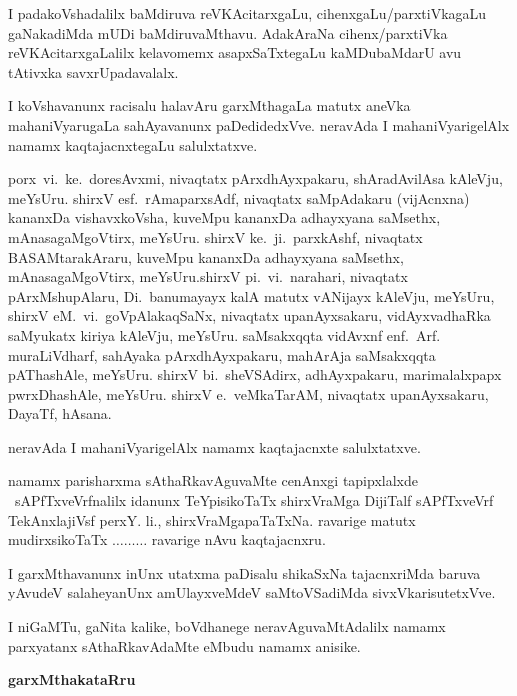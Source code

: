I padakoVshadalilx baMdiruva reVKAcitarxgaLu, cihenxgaLu/parxtiVkagaLu gaNakadiMda mUDi baMdiruvaMthavu. AdakAraNa cihenx/parxtiVka reVKAcitarxgaLalilx kelavomemx asapxSaTxtegaLu kaMDubaMdarU avu tAtivxka savxrUpadavalalx.

I koVshavanunx racisalu halavAru garxMthagaLa matutx aneVka mahaniVyarugaLa sahAyavanunx paDedidedxVve. neravAda I mahaniVyarigelAlx namamx kaqtajacnxtegaLu salulxtatxve.

porx\ vi.~ke.\ doresAvxmi, nivaqtatx pArxdhAyxpakaru, shAradAvilAsa kAleVju, meYsUru. shirxV esf.\ rAmaparxsAdf, nivaqtatx saMpAdakaru (vijAcnxna) kananxDa vishavxkoVsha, kuveMpu kananxDa adhayxyana saMsethx, mAnasagaMgoVtirx, meYsUru. shirxV ke.~ji.\ parxkAshf, nivaqtatx BASAMtarakAraru, kuveMpu kananxDa adhayxyana saMsethx, mAnasagaMgoVtirx, meYsUru.\break shirxV pi.~vi.\ narahari, nivaqtatx pArxMshupAlaru, Di.~banumayayx kalA matutx vANijayx kAleVju, meYsUru, shirxV eM.~vi.\ goVpAlakaqSaNx, nivaqtatx upanAyxsakaru, vidAyxvadhaRka saMyukatx kiriya kAleVju, meYsUru. saMsakxqqta vidAvxnf enf.~Arf. muraLiVdharf, sahAyaka pArxdhAyxpakaru, mahArAja saMsakxqqta pAThashAle, meYsUru. shirxV bi.\ sheVSAdirx, adhAyxpakaru, marimalalxpapx pwrxDhashAle, meYsUru. shirxV e.\ veMkaTarAM, nivaqtatx upanAyxsakaru, DayaTf, hAsana.

neravAda I mahaniVyarigelAlx namamx kaqtajacnxte salulxtatxve.

namamx parisharxma sAthaRkavAguvaMte cenAnxgi tapipxlalxde \eng{\LaTeX}\ sAPfTxveVrfnalilx idanunx TeYpisikoTaTx    
 shirxVraMga DijiTalf sAPfTxveVrf TekAnxlajiVsf perxY. li., shirxVraMgapaTaTxNa. ravarige matutx mudirxsikoTaTx  $\ldots\ldots\ldots$ ravarige nAvu kaqtajacnxru.

I garxMthavanunx inUnx utatxma paDisalu shikaSxNa tajacnxriMda baruva yAvudeV salaheyanUnx amUlayxveMdeV saMtoVSadiMda sivxVkarisutetxVve.

I niGaMTu,  gaNita kalike, boVdhanege neravAguvaMtAdalilx namamx parxyatanx sAthaRkavAdaMte eMbudu namamx anisike.

\vskip 1.5cm

\noindent
{}\hfill {\Large\bf garxMthakataRru}\qquad\qquad\,

\smallskip
\noindent
{}





